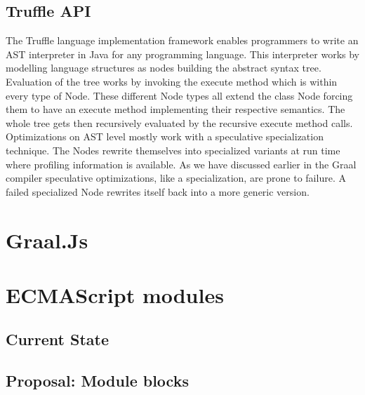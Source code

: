 \subsection{Truffle API}
The Truffle language implementation framework enables programmers to write an AST interpreter in Java for any programming language. This interpreter works by modelling language structures as nodes building the abstract syntax tree. Evaluation of the tree works by invoking the execute method which is within every type of Node. These different Node types all extend the class Node forcing them to have an execute method implementing their respective semantics. The whole tree gets then recursively evaluated by the recursive execute method calls.\\
Optimizations on AST level mostly work with a speculative specialization technique. The Nodes rewrite themselves into specialized variants at run time where profiling information is available. \cite{wuerthSelf} As we have discussed earlier in the Graal compiler speculative optimizations, like a specialization, are prone to failure. A failed specialized Node rewrites itself back into a more generic version.\\
 

\section{Graal.Js}

\section{ECMAScript modules}
\subsection{Current State}

\subsection{Proposal: Module blocks}